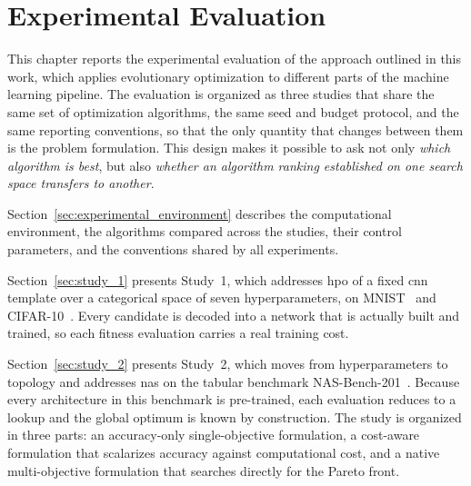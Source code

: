 
\chapter{Experimental Evaluation}
\label{cha:experimental_evaluation}

This chapter reports the experimental evaluation of the approach outlined in this work, which applies evolutionary optimization to different parts of the machine learning pipeline. The evaluation is organized as three studies that share the same set of optimization algorithms, the same seed and budget protocol, and the same reporting conventions, so that the only quantity that changes between them is the problem formulation. This design makes it possible to ask not only \emph{which algorithm is best}, but also \emph{whether an algorithm ranking established on one search space transfers to another}.

Section~\ref{sec:experimental_environment} describes the computational environment, the algorithms compared across the studies, their control parameters, and the conventions shared by all experiments.

Section~\ref{sec:study_1} presents Study~1, which addresses \acrfull{hpo} of a fixed \acrshort{cnn} template over a categorical space of seven hyperparameters, on MNIST~\cite{lecun1998mnist} and CIFAR-10~\cite{krizhevsky2009cifar}. Every candidate is decoded into a network that is actually built and trained, so each fitness evaluation carries a real training cost.

Section~\ref{sec:study_2} presents Study~2, which moves from hyperparameters to topology and addresses \acrfull{nas} on the tabular benchmark NAS-Bench-201~\cite{dong2020nasbench201}. Because every architecture in this benchmark is pre-trained, each evaluation reduces to a lookup and the global optimum is known by construction. The study is organized in three parts: an accuracy-only single-objective formulation, a cost-aware formulation that scalarizes accuracy against computational cost, and a native multi-objective formulation that searches directly for the Pareto front.

